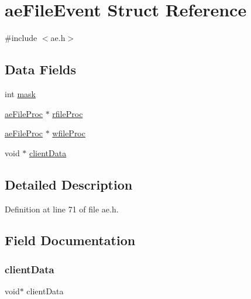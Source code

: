 \hypertarget{structae_file_event}{}\section{ae\+File\+Event Struct Reference}
\label{structae_file_event}


{\ttfamily \#include $<$ae.\+h$>$}

\subsection*{Data Fields}
\begin{DoxyCompactItemize}
\item 
int \hyperlink{structae_file_event_ab77cc972f3ee899689ba053015472ccd}{mask}
\item 
\hyperlink{ae_8h_a26d6e9533f135cb463f29239607ba50c}{ae\+File\+Proc} $\ast$ \hyperlink{structae_file_event_aaf65022bec2a73c459e46cbfb41229d3}{rfile\+Proc}
\item 
\hyperlink{ae_8h_a26d6e9533f135cb463f29239607ba50c}{ae\+File\+Proc} $\ast$ \hyperlink{structae_file_event_af95a1a47baf2ba0db91c96e77d01a7f0}{wfile\+Proc}
\item 
void $\ast$ \hyperlink{structae_file_event_a31433b6f2825807bd6d9c0675ff7c4cb}{client\+Data}
\end{DoxyCompactItemize}


\subsection{Detailed Description}


Definition at line 71 of file ae.\+h.



\subsection{Field Documentation}
\mbox{\label{structae_file_event_a31433b6f2825807bd6d9c0675ff7c4cb}} 
\subsubsection{\texorpdfstring{client\+Data}{clientData}}
{\footnotesize\ttfamily void$\ast$ client\+Data}




